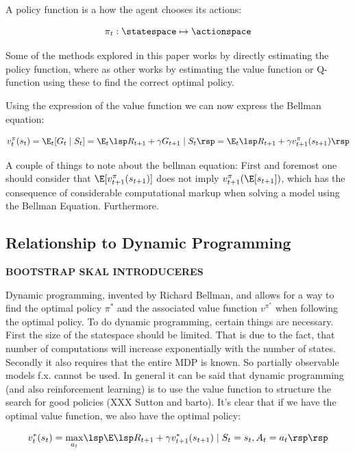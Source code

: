 A policy function is a how the agent chooses its actions:

\begin{equation}
    \pi_t : \statespace \mapsto \actionspace 
\end{equation}

Some of the methods explored in this paper works by directly estimating the policy function, where as other works by estimating the value function or Q-function using these to find the correct optimal policy.

Using the expression of the value function we can now express the Bellman equation:

\begin{equation}
    v^{\pi}_{t} (s_t) = \E_t [G_t \mid S_t] = \E_t  \lsp R_{t+1} + \gamma G_{t+1} \mid S_t \rsp = \E_t \lsp R_{t+1} + \gamma v_{t+1}^{\pi}(s_{t+1}) \rsp
\end{equation}

A couple of things to note about the bellman equation: First and foremost one should consider that $\E [v_{t+1}^\pi(s_{t+1})]$ does not imply $v_{t+1}^{\pi}(\E[s_{t+1}])$, which has the consequence of considerable computational markup when solving a model using the Bellman Equation. Furthermore.

\subsection{Relationship to Dynamic Programming}

\textbf{BOOTSTRAP SKAL INTRODUCERES}

Dynamic programming, invented by Richard Bellman, and allows for a way to find the optimal policy $\pi^{*}$ and the associated value function $v^{\pi^{*}}$ when following the optimal policy. To do dynamic programming, certain things are necessary. First the size of the statespace should be limited. That is due to the fact, that number of computations will increase exponentially with the number of states. Secondly it also requires that the entire MDP is known. So partially observable models f.x. cannot be used. In general it can be said that dynamic programming (and also reinforcement learning) is to use the value function to structure the search for good policies  (XXX Sutton and barto). It's clear that if we have the optimal value function, we also have the optimal policy:

\begin{equation}
    v_t^{*}(s_t) = \underset{a_t}{\max} \lsp \E \lsp R_{t+1} + \gamma v^{*}_{t+1}(s_{t+1}) \mid S_t = s_t, A_t = a_t\rsp \rsp
\end{equation}


